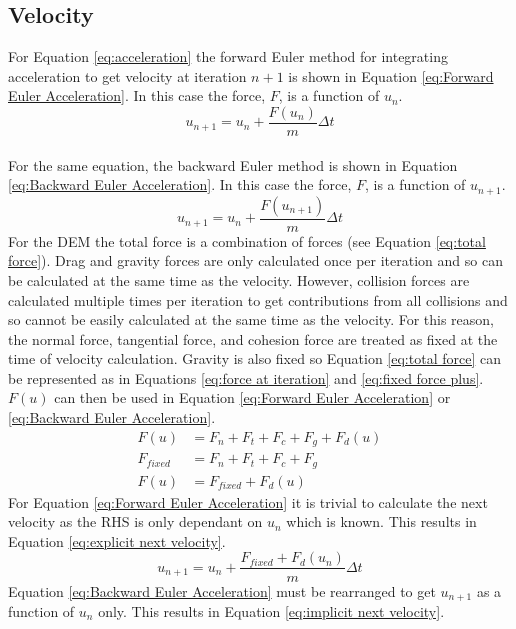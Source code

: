 \documentclass[a4paper,11pt,titlepage]{report}
\begin{document}
\subsection{Velocity}
For Equation \ref{eq:acceleration} the forward Euler method for integrating acceleration to get velocity at iteration $n + 1$ is shown in Equation \ref{eq:Forward Euler Acceleration}. In this case the force, $F$, is a function of $u_n$.
\begin{equation}
u_{n+1} = u_{n} + \dfrac{F(u_n)}{m}\Delta t
\label{eq:Forward Euler Acceleration}
\end{equation}
\\For the same equation, the backward Euler method is shown in Equation \ref{eq:Backward Euler Acceleration}. In this case the force, $F$, is a function of $u_{n+1}$.
\begin{equation}
u_{n+1} = u_{n} + \dfrac{F(u_{n+1})}{m}\Delta t
\label{eq:Backward Euler Acceleration}
\end{equation}
For the DEM the total force is a combination of forces (see Equation \ref{eq:total force}). Drag and gravity forces are only calculated once per iteration and so can be calculated at the same time as the velocity. However, collision forces are calculated multiple times per iteration to get contributions from all collisions and so cannot be easily calculated at the same time as the velocity. For this reason, the normal force, tangential force, and cohesion force are treated as fixed at the time of velocity calculation. Gravity is also fixed so Equation \ref{eq:total force} can be represented as in Equations \ref{eq:force at iteration} and \ref{eq:fixed force plus}. $F(u)$ can then be used in Equation \ref{eq:Forward Euler Acceleration} or \ref{eq:Backward Euler Acceleration}.
\begin{align}
F(u) &= F_n + F_t + F_c + F_g + F_d(u)
\label{eq:force at iteration} \\
F_{fixed} &= F_n + F_t + F_c + F_g \\
F(u) &= F_{fixed} + F_d(u) \label{eq:fixed force plus}
\end{align}
For Equation \ref{eq:Forward Euler Acceleration} it is trivial to calculate the next velocity as the RHS is only dependant on $u_n$ which is known. This results in Equation \ref{eq:explicit next velocity}.
\begin{equation}
u_{n+1} = u_n + \dfrac{F_{fixed} + F_d(u_n)}{m} \Delta t \label{eq:explicit next velocity}
\end{equation}
Equation \ref{eq:Backward Euler Acceleration} must be rearranged to get $u_{n+1}$ as a function of $u_{n}$ only. This results in Equation \ref{eq:implicit next velocity}.
\end{document}
